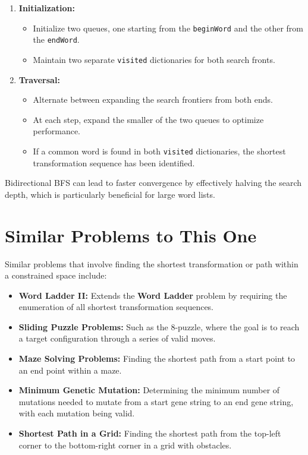 \begin{enumerate}
    \item \textbf{Initialization:}
    \begin{itemize}
        \item Initialize two queues, one starting from the \texttt{beginWord} and the other from the \texttt{endWord}.
        \item Maintain two separate \texttt{visited} dictionaries for both search fronts.
    \end{itemize}
    
    \item \textbf{Traversal:}
    \begin{itemize}
        \item Alternate between expanding the search frontiers from both ends.
        \item At each step, expand the smaller of the two queues to optimize performance.
        \item If a common word is found in both \texttt{visited} dictionaries, the shortest transformation sequence has been identified.
    \end{itemize}
\end{enumerate}

Bidirectional BFS can lead to faster convergence by effectively halving the search depth, which is particularly beneficial for large word lists.

\section*{Similar Problems to This One}

Similar problems that involve finding the shortest transformation or path within a constrained space include:

\begin{itemize}
    \item \textbf{Word Ladder II:} Extends the \textbf{Word Ladder} problem by requiring the enumeration of all shortest transformation sequences.
    
    \item \textbf{Sliding Puzzle Problems:} Such as the 8-puzzle, where the goal is to reach a target configuration through a series of valid moves.
    
    \item \textbf{Maze Solving Problems:} Finding the shortest path from a start point to an end point within a maze.
    
    \item \textbf{Minimum Genetic Mutation:} Determining the minimum number of mutations needed to mutate from a start gene string to an end gene string, with each mutation being valid.
    
    \item \textbf{Shortest Path in a Grid:} Finding the shortest path from the top-left corner to the bottom-right corner in a grid with obstacles.
\end{itemize}

